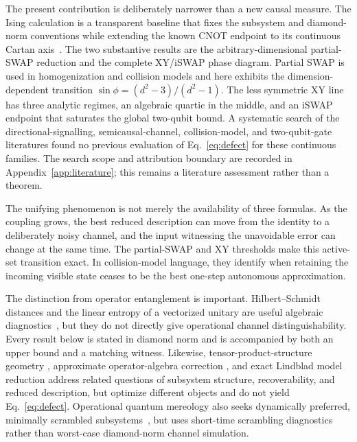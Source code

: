 \documentclass[11pt,a4paper]{article}
\theoremstyle{remark}
\begin{document}
The present contribution is deliberately narrower than a new causal measure.
The Ising calculation is a transparent baseline that fixes the subsystem and
diamond-norm conventions while extending the known CNOT endpoint to its
continuous Cartan axis~\cite{zhang2003}.  The two substantive results are the
arbitrary-dimensional partial-SWAP reduction and the complete XY/iSWAP phase
diagram.  Partial SWAP is used in homogenization and collision models
\cite{ziman2002,scarani2002,ciccarello2022} and here exhibits the
dimension-dependent
transition $\sin\phi=(d^2-3)/(d^2-1)$.  The less symmetric XY line has three
analytic regimes, an algebraic quartic in the middle, and an iSWAP endpoint
that saturates the global two-qubit bound.  A systematic search of the
directional-signalling, semicausal-channel, collision-model, and two-qubit-gate
literatures found no previous evaluation of Eq.~\eqref{eq:defect} for these
continuous families.  The search scope and attribution boundary are recorded
in Appendix~\ref{app:literature}; this remains a literature assessment rather
than a theorem.

The unifying phenomenon is not merely the availability of three formulas.
As the coupling grows, the best reduced description can move from the
identity to a deliberately noisy channel, and the input witnessing the
unavoidable error can change at the same time.  The partial-SWAP and XY
thresholds make this active-set transition exact.  In collision-model
language, they identify when retaining the incoming visible state ceases to
be the best one-step autonomous approximation.

The distinction from operator entanglement is important.  Hilbert--Schmidt
distances and the linear entropy of a vectorized unitary are useful algebraic
diagnostics~\cite{zanardi2001}, but they do not directly give operational
channel distinguishability.  Every result below is stated in diamond norm and
is accompanied by both an upper bound and a matching witness.
Likewise, tensor-product-structure geometry
\cite{andreadakis2025}, approximate operator-algebra correction
\cite{beny2010}, and exact Lindblad model reduction
\cite{grigoletto2025} address related questions of subsystem structure,
recoverability, and reduced description, but optimize different objects and
do not yield Eq.~\eqref{eq:defect}.  Operational quantum mereology also seeks
dynamically preferred, minimally scrambled subsystems~\cite{zanardi2024}, but
uses short-time scrambling diagnostics rather than worst-case diamond-norm
channel simulation.
\end{document}
